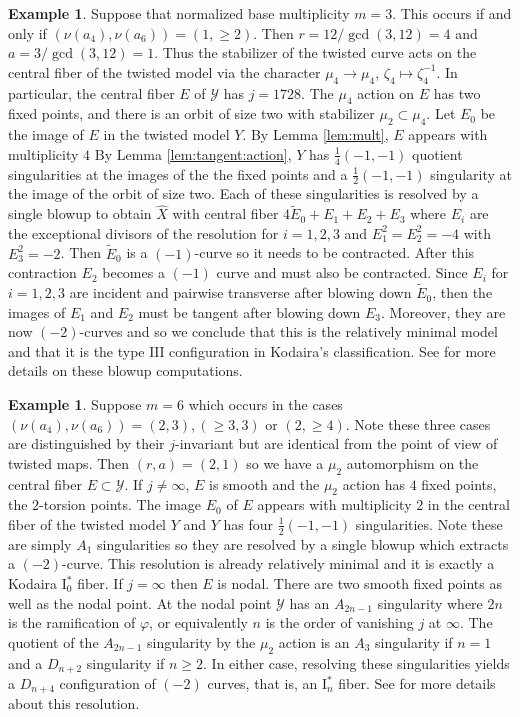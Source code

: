 \documentclass[a4paper,12pt]{amsart}
\theoremstyle{definition}
\newtheorem{exmp}[thm]{Example}
\newcommand{\cY}{\mathcal{Y}}
\begin{document}
	
	\begin{exmp} Suppose that normalized base multiplicity $m = 3$. This occurs if and only if $(\nu(a_4), \nu(a_6)) = (1, \geq 2)$. Then $r = 12/\gcd(3,12) = 4$ and $a = 3/\gcd(3,12) = 1$. Thus the stabilizer of the twisted curve acts on the central fiber of the twisted model via the character $\mu_4 \to \mu_4$, $\zeta_4 \mapsto \zeta^{-1}_4$. In particular, the central fiber $E$ of $\cY$ has $j = 1728$. The $\mu_4$ action on $E$ has two fixed points, and there is an orbit of size two with stabilizer $\mu_2 \subset \mu_4$. Let $E_0$ be the image of $E$ in the twisted model $Y$. By Lemma \ref{lem:mult}, $E$ appears with multiplicity $4$ By Lemma \ref{lem:tangent:action}, $Y$ has $\frac{1}{4}(-1,-1)$ quotient singularities at the images of the the fixed points and a $\frac{1}{2}(-1,-1)$ singularity at the image of the orbit of size two. Each of these singularities is resolved by a single blowup to obtain $\hat{X}$ with central fiber $4\tilde{E}_0 + E_1 + E_2 + E_3$ where $E_i$ are the exceptional divisors of the resolution for $i = 1,2,3$ and $E_1^2 = E_2^2 = -4$ with $E_3^2 = -2$. Then $\tilde{E}_0$ is a $(-1)$-curve so it needs to be contracted. After this contraction $E_2$ becomes a $(-1)$ curve and must also be contracted. Since $E_i$ for $i = 1,2,3$ are incident and pairwise transverse after blowing down $\tilde{E}_0$, then the images of $E_1$ and $E_2$ must be tangent after blowing down $E_3$. Moreover, they are now $(-2)$-curves and so we conclude that this is the relatively minimal model and that it is the type $\mathrm{III}$ configuration in Kodaira's classification. See \cite[Sec. 4]{AB} for more details on these blowup computations. 
	\end{exmp}
	
	\begin{exmp}
		Suppose $m = 6$ which occurs in the cases $(\nu(a_4), \nu(a_6)) = (2,3), (\geq 3, 3)$ or $(2, \geq 4)$. Note these three cases are distinguished by their $j$-invariant but are identical from the point of view of twisted maps. Then $(r,a) = (2,1)$ so we have a $\mu_2$ automorphism on the central fiber $E \subset \cY$. If $j \neq \infty$, $E$ is smooth and the $\mu_2$ action has $4$ fixed points, the $2$-torsion points. The image $E_0$ of $E$ appears with multiplicity $2$ in the central fiber of the twisted model $Y$ and $Y$ has four $\frac{1}{2}(-1,-1)$ singularities. Note these are simply $A_1$ singularities so they are resolved by a single blowup which extracts a $(-2)$-curve. This resolution is already relatively minimal and it is exactly a Kodaira $\mathrm{I}_0^*$ fiber. If $j = \infty$ then $E$ is nodal. There are two smooth fixed points as well as the nodal point. At the nodal point $\cY$ has an $A_{2n-1}$ singularity where $2n$ is the ramification of $\varphi$, or equivalently $n$ is the order of vanishing $j$ at $\infty$. The quotient of the $A_{2n-1}$ singularity by the $\mu_2$ action is an $A_3$ singularity if $n = 1$ and a $D_{n + 2}$ singularity if  $n \geq 2$. In either case, resolving these singularities yields a $D_{n+4}$ configuration of $(-2)$ curves, that is, an $\mathrm{I}_n^*$ fiber. See \cite[Lem. 4.2]{AB} for more details about this resolution. 
	\end{exmp}
	
\end{document}
